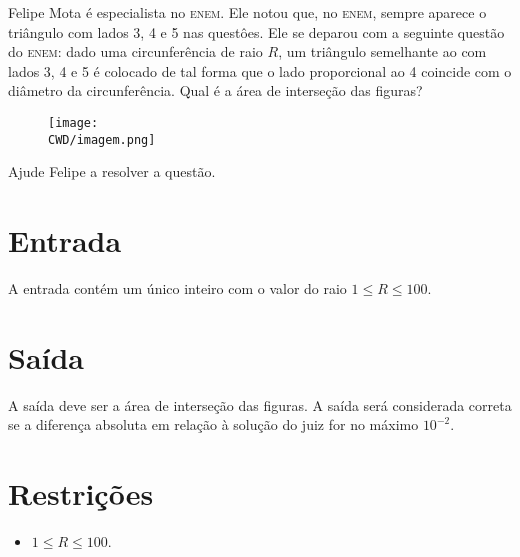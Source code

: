 %

Felipe Mota é especialista no \textsc{enem}. Ele notou que, no \textsc{enem}, sempre aparece o triângulo com lados 3, 4 e 5 nas questôes. Ele se deparou com a seguinte questão do \textsc{enem}: dado uma circunferência de raio $R$, um triângulo semelhante ao com lados 3, 4 e 5 é colocado de tal forma que o lado proporcional ao 4 coincide com o diâmetro da circunferência. Qual é a área de interseção das figuras?

\begin{figure}[H]
  \centering
  \texttt{[image: \\CWD/imagem.png]}
\end{figure}

Ajude Felipe a resolver a questão.

%
%

\section*{Entrada}

A entrada contém um único inteiro com o valor do raio $1 \leq R \leq 100$.

%
%

\section*{Saída}

A saída deve ser a área de interseção das figuras. A saída será considerada correta se a diferença absoluta em relação à solução do juiz for no máximo $10^{-2}$.

\section*{Restrições}

\begin{itemize}
\item $ 1 \leq R \leq 100.$\end{itemize}


\exemplo
